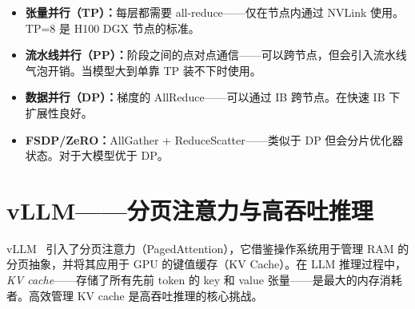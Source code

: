 \begin{intuitionbox}[根据带宽选择并行策略]
\begin{itemize}
  \item \textbf{张量并行（TP）：}每层都需要 all-reduce——仅在节点内通过 NVLink 使用。TP=8 是 H100 DGX 节点的标准。
  \item \textbf{流水线并行（PP）：}阶段之间的点对点通信——可以跨节点，但会引入流水线气泡开销。当模型大到单靠 TP 装不下时使用。
  \item \textbf{数据并行（DP）：}梯度的 AllReduce——可以通过 IB 跨节点。在快速 IB 下扩展性良好。
  \item \textbf{FSDP/ZeRO：}AllGather + ReduceScatter——类似于 DP 但会分片优化器状态。对于大模型优于 DP。
\end{itemize}
\end{intuitionbox}

\section{vLLM——分页注意力与高吞吐推理}
\label{vllm-pagedattention-and-high-throughput-inference}

vLLM~\cite{kwon2023efficient} 引入了分页注意力（PagedAttention），它借鉴操作系统用于管理 RAM 的分页抽象，并将其应用于 GPU 的键值缓存（KV Cache）。在 LLM 推理过程中，\emph{KV cache}——存储了所有先前 token 的 key 和 value 张量——是最大的内存消耗者。高效管理 KV cache 是高吞吐推理的核心挑战。


